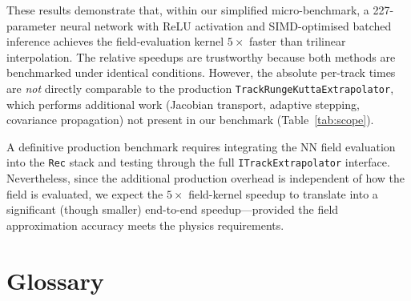 \documentclass[11pt,a4paper]{article}
\begin{document}
These results demonstrate that, within our simplified micro-benchmark,
a 227-parameter neural network with ReLU activation and
SIMD-optimised batched inference achieves the field-evaluation
kernel $5\times$ faster than trilinear interpolation.  The relative
speedups are trustworthy because both methods are benchmarked under
identical conditions.  However, the absolute per-track times are
\emph{not} directly comparable to the production
\texttt{TrackRungeKuttaExtrapolator}, which performs additional
work (Jacobian transport, adaptive stepping, covariance propagation)
not present in our benchmark (Table~\ref{tab:scope}).

A definitive production benchmark requires integrating the NN field
evaluation into the \texttt{Rec} stack and testing through the full
\texttt{ITrackExtrapolator} interface.  Nevertheless, since the
additional production overhead is independent of how the field is
evaluated, we expect the $5\times$ field-kernel speedup to translate
into a significant (though smaller) end-to-end speedup---provided
the field approximation accuracy meets the physics requirements.


\section*{Glossary}
\label{sec:glossary}
\end{document}

